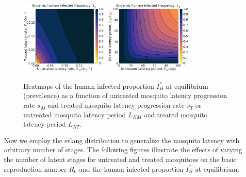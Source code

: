 \documentclass[11pt]{article}
\begin{document}
\begin{figure}[H]
  \centering
  \includegraphics[width=0.4\textwidth]{../../fig/Ih_STxSM.pdf}
  \includegraphics[width=0.4\textwidth]{../../fig/Ih_STxSM_rev.pdf}
  \caption{Heatmaps of the human infected proportion $I_H^*$ at equilibrium (prevalence) as a function of untreated mosquito latency progression rate $s_M$ and treated mosquito latency progression rate $s_T$ or untreated mosquito latency period $L_{NM}$ and treated mosquito latency period $L_{NT}$.}
\end{figure}

Now we employ the erlang distribution to generalize the mosquito latency with arbitrary number of stages. The following figures illustrate the effects of varying the number of latent stages for untreated and treated mosquitoes on the basic reproduction number $R_0$ and the human infected proportion $I_H^*$ at equilibrium.
\end{document}
